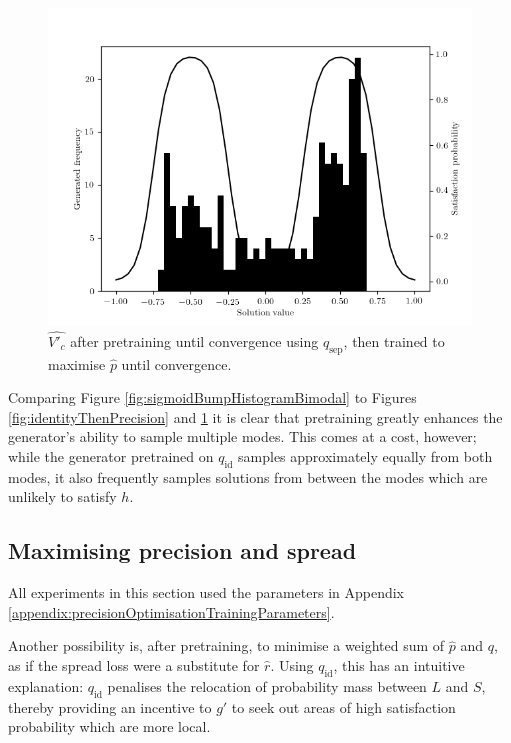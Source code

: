 \documentclass[../../main.tex]{subfiles}
\begin{document}
\begin{figure}[H]
    \begin{center}
    \includegraphics[width=\textwidth]{separationThenPrecision}
    \caption[Generator after $q_\text{sep}$ initialised training]{
        $\hat{V'_c}$ after pretraining until convergence using $q_\text{sep}$, then trained to maximise $\hat{p}$ until convergence.
    }
    \label{fig:separationThenPrecision}
    \end{center}
\end{figure}
Comparing Figure \ref{fig:sigmoidBumpHistogramBimodal} to Figures \ref{fig:identityThenPrecision} and \ref{fig:separationThenPrecision} it is clear that pretraining greatly enhances the generator's ability to sample multiple modes.
This comes at a cost, however; while the generator pretrained on $q_\text{id}$ samples approximately equally from both modes, it also frequently samples solutions from between the modes which are unlikely to satisfy $h$.

\subsection{Maximising precision and spread} \label{subsection:maximisingPrecisionAndSpread}

All experiments in this section used the parameters in Appendix \ref{appendix:precisionOptimisationTrainingParameters}.

Another possibility is, after pretraining, to minimise a weighted sum of $\hat{p}$ and $q$, as if the spread loss were a substitute for $\hat{r}$.
Using $q_\text{id}$, this has an intuitive explanation: $q_\text{id}$ penalises the relocation of probability mass between $L$ and $S$, thereby providing an incentive to $g'$ to seek out areas of high satisfaction probability which are more local.
\end{document}
